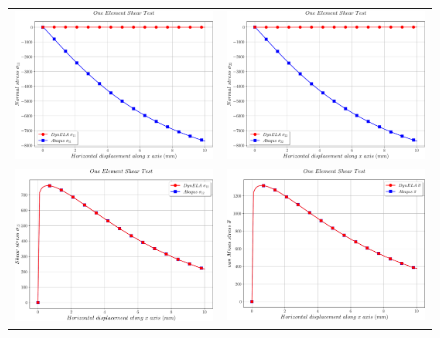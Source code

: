 \begin{figure}[h]
\begin{centering}
\begin{tabular}{cc}
\includegraphics[width=0.45\columnwidth]{Figures/Samples/Element/Shear-Plastic_stress_11} & \includegraphics[width=0.45\columnwidth]{Figures/Samples/Element/Shear-Plastic_stress_22}\tabularnewline
\includegraphics[width=0.45\columnwidth]{Figures/Samples/Element/Shear-Plastic_stress_12} & \includegraphics[width=0.45\columnwidth]{Figures/Samples/Element/Shear-Plastic_vonMises}\tabularnewline

\end{tabular}
\end{centering}
\end{figure}
